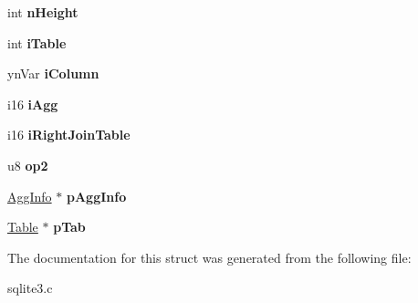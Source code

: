 \begin{DoxyCompactItemize}
\begin{tabbing}
\end{tabbing}\item 
int {\bfseries n\+Height}\hypertarget{structExpr_a5a893ea309f801f23404e7e5ac02732b}{}\label{structExpr_a5a893ea309f801f23404e7e5ac02732b}

\item 
int {\bfseries i\+Table}\hypertarget{structExpr_af8e273f4d7d173bfb5996ed09054611c}{}\label{structExpr_af8e273f4d7d173bfb5996ed09054611c}

\item 
yn\+Var {\bfseries i\+Column}\hypertarget{structExpr_ad19251a8eb6db3cf0bdffe0dcb07eeba}{}\label{structExpr_ad19251a8eb6db3cf0bdffe0dcb07eeba}

\item 
i16 {\bfseries i\+Agg}\hypertarget{structExpr_a9fe0ed6360b0a4cf5b67ab8def922033}{}\label{structExpr_a9fe0ed6360b0a4cf5b67ab8def922033}

\item 
i16 {\bfseries i\+Right\+Join\+Table}\hypertarget{structExpr_aa49b76f3628a7bf2b0997c33461cc651}{}\label{structExpr_aa49b76f3628a7bf2b0997c33461cc651}

\item 
u8 {\bfseries op2}\hypertarget{structExpr_a0eacba0a2a6977e434b096b1cb9d5b9e}{}\label{structExpr_a0eacba0a2a6977e434b096b1cb9d5b9e}

\item 
\hyperlink{structAggInfo}{Agg\+Info} $\ast$ {\bfseries p\+Agg\+Info}\hypertarget{structExpr_a4fde82477256ee85f3a906263549082a}{}\label{structExpr_a4fde82477256ee85f3a906263549082a}

\item 
\hyperlink{structTable}{Table} $\ast$ {\bfseries p\+Tab}\hypertarget{structExpr_a27c8824b41d853eeeebe61cf3ac1ae5a}{}\label{structExpr_a27c8824b41d853eeeebe61cf3ac1ae5a}

\end{DoxyCompactItemize}


The documentation for this struct was generated from the following file\+:\begin{DoxyCompactItemize}
\item 
sqlite3.\+c\end{DoxyCompactItemize}
